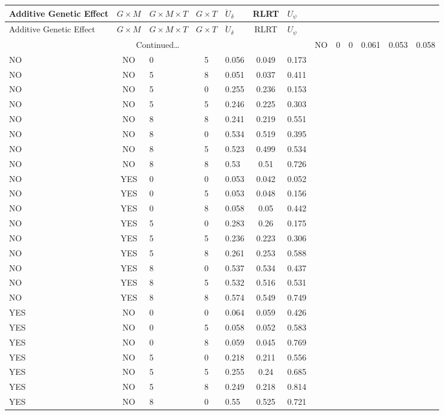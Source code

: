 \documentclass[hidelinks]{article}
\begin{document}
\begin{center}
\begin{longtable}{lclclclclclc|c|}
\hline
Additive Genetic Effect & $G\times M$& $G \times M \times T$ & $G \times T$ &  $\ddot{U}_\delta$ & RLRT & $U_\psi$  \\ \hline
\endfirsthead
Additive Genetic Effect & $G\times M$& $G \times M \times T$ & $G \times T$ &  $\ddot{U}_\delta$ & RLRT & $U_\psi$  \\ \hline
\endhead
\multicolumn{7}{c}{{Continued\ldots}} \
\endfoot
\hline
\endlastfoot
NO & NO & 0 & 0 & 0.061 & 0.053 & 0.058 \\
NO & NO & 0 & 5 & 0.056 & 0.049 & 0.173 \\
NO & NO & 5 & 8 & 0.051 & 0.037 & 0.411 \\
NO & NO & 5 & 0 & 0.255 & 0.236 & 0.153 \\
NO & NO & 5 & 5 & 0.246 & 0.225 & 0.303 \\
NO & NO & 8 & 8 & 0.241 & 0.219 & 0.551 \\
NO & NO & 8 & 0 & 0.534 & 0.519 & 0.395 \\
NO & NO & 8 & 5 & 0.523 & 0.499 & 0.534 \\
NO & NO & 8 & 8 & 0.53 & 0.51 & 0.726 \\ \hdashline
NO & YES & 0 & 0 & 0.053 & 0.042 & 0.052 \\
NO & YES & 0 & 5 & 0.053 & 0.048 & 0.156 \\
NO & YES & 0 & 8 & 0.058 & 0.05 & 0.442 \\
NO & YES & 5 & 0 & 0.283 & 0.26 & 0.175 \\
NO & YES & 5 & 5 & 0.236 & 0.223 & 0.306 \\
NO & YES & 5 & 8 & 0.261 & 0.253 & 0.588 \\
NO & YES & 8 & 0 & 0.537 & 0.534 & 0.437 \\
NO & YES & 8 & 5 & 0.532 & 0.516 & 0.531 \\
NO & YES & 8 & 8 & 0.574 & 0.549 & 0.749 \\ \hline
YES & NO & 0 & 0 & 0.064 & 0.059 & 0.426 \\
YES & NO & 0 & 5 & 0.058 & 0.052 & 0.583 \\
YES & NO & 0 & 8 & 0.059 & 0.045 & 0.769 \\
YES & NO & 5 & 0 & 0.218 & 0.211 & 0.556 \\
YES & NO & 5 & 5 & 0.255 & 0.24 & 0.685 \\
YES & NO & 5 & 8 & 0.249 & 0.218 & 0.814 \\
YES & NO & 8 & 0 & 0.55 & 0.525 & 0.721 \\

\end{longtable}
\end{center}
\end{document}
